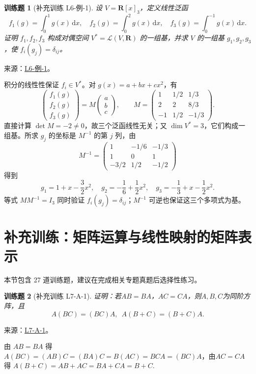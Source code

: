 \documentclass[UTF8,12pt,a4paper,fontset=fandol]{ctexart}
\newtheorem{exercise}{训练题}[section]
\begin{document}
\begin{exercise}[补充训练 L6-例-1]\label{prob:L6-例-1}
设 $V=\mathbf R[x]_3$，定义线性泛函
\[f_1(g)=\int_0^1g(x)\,\mathrm dx,\quad f_2(g)=\int_0^2g(x)\,\mathrm dx,\quad f_3(g)=\int_0^{-1}g(x)\,\mathrm dx.\]
证明 $f_1,f_2,f_3$ 构成对偶空间 $V^*=\mathcal L(V,\mathbf R)$ 的一组基，并求 $V$ 的一组基 $g_1,g_2,g_3$，使 $f_i(g_j)=\delta_{ij}$。
\end{exercise}
\noindent 来源：\href{https://github.com/yhwu-is/Linear-Algebra-Left-Undone/blob/new/%E8%AE%B2%E4%B9%89/%E4%B8%93%E9%A2%98/6%20%E5%AF%B9%E5%81%B6%E7%A9%BA%E9%97%B4.tex}{L6-例-1}。
\begin{solve}
积分的线性性保证 $f_i\in V^*$。对 $g(x)=a+bx+cx^2$，有
\[\begin{pmatrix}f_1(g)\\f_2(g)\\f_3(g)\end{pmatrix}=M\begin{pmatrix}a\\b\\c\end{pmatrix},\qquad
M=\begin{pmatrix}1&1/2&1/3\\2&2&8/3\\-1&1/2&-1/3\end{pmatrix}.\]
直接计算 $\det M=-2\ne0$，故三个泛函线性无关；又 $\dim V^*=3$，它们构成一组基。所求 $g_j$ 的坐标是 $M^{-1}$ 的第 $j$ 列，由
\[M^{-1}=\begin{pmatrix}1&-1/6&-1/3\\1&0&1\\-3/2&1/2&-1/2\end{pmatrix}\]
得到
\[g_1=1+x-\frac32x^2,\quad g_2=-\frac16+\frac12x^2,\quad g_3=-\frac13+x-\frac12x^2.\]
等式 $MM^{-1}=I_3$ 同时验证 $f_i(g_j)=\delta_{ij}$；$M^{-1}$ 可逆也保证这三个多项式为基。
\end{solve}

\section{补充训练：矩阵运算与线性映射的矩阵表示}

本节包含 27 道训练题，建议在完成相关专题真题后选择性练习。

\begin{exercise}[补充训练 L7-A-1]\label{prob:L7-A-1}
证明：若$AB=BA$，$AC=CA$，则$A,B,C$为同阶方阵，且
        \[A(BC)=(BC)A,\enspace A(B+C)=(B+C)A.\]
\end{exercise}
\noindent 来源：\href{https://github.com/yhwu-is/Linear-Algebra-Left-Undone/blob/new/%E8%AE%B2%E4%B9%89/%E4%B8%93%E9%A2%98/7%20%E7%BA%BF%E6%80%A7%E6%98%A0%E5%B0%84%E7%9F%A9%E9%98%B5%E8%A1%A8%E7%A4%BA%E4%B8%8E%E7%9F%A9%E9%98%B5%E8%BF%90%E7%AE%97%E5%9F%BA%E7%A1%80.tex}{L7-A-1}。
\begin{solve}
由 $AB=BA$ 得 $A(BC)=(AB)C=(BA)C=B(AC)=BCA=(BC)A$，由$AC=CA$ 得 $A(B+C)=AB+AC=BA+CA=B+C$.
\end{solve}
\end{document}
